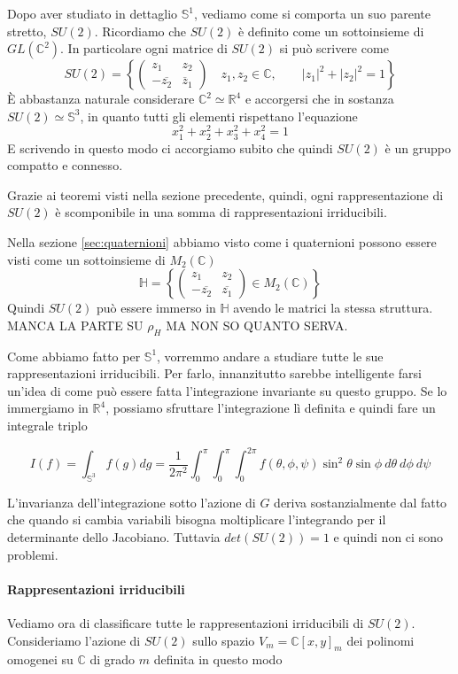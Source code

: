 \documentclass[11pt]{article}
\theoremstyle{plain}
\theoremstyle{definition}
\theoremstyle{remark}
\newcommand{\C}{\mathbb{C}}
\newcommand{\R}{\mathbb{R}}
\newcommand{\HH}{\mathbb{H}}
\newcommand{\dint}{\displaystyle\int}
\DeclareMathOperator{\iso}{\simeq}
\begin{document}
Dopo aver studiato in dettaglio $\mathbb{S}^1$, vediamo come si comporta un suo parente stretto, $SU(2)$. Ricordiamo che $SU(2)$ è definito come un sottoinsieme di $GL(\C^2)$. In particolare ogni matrice di $SU(2)$ si può scrivere come
 \[ SU(2) = \left\{  \left(\begin{array}{cc} z_1 & z_2 \\ -\overline{z_2} & \overline z_1 \end{array}\right) \quad z_1, z_2 \in \C  , \qquad |z_1|^2 + |z_2|^2 = 1\right\} \]
 È abbastanza naturale considerare $\C^2 \iso \R^4$ e accorgersi che in sostanza $SU(2) \iso \mathbb{S}^3$, in quanto tutti gli elementi rispettano l'equazione
 \[ x_1 ^2 + x_2^2 + x_3^2 + x_4^2 = 1 \]
E scrivendo in questo modo ci accorgiamo subito che quindi $SU(2)$ è un gruppo compatto e connesso.

Grazie ai teoremi visti nella sezione precedente, quindi,
ogni rappresentazione di $SU(2)$ è scomponibile in una somma di rappresentazioni irriducibili.

Nella sezione \ref{sec:quaternioni} abbiamo visto come i quaternioni possono essere visti come un sottoinsieme di $M_2(\C)$
\[
\mathbb{H}= \left\{\begin{pmatrix}
 z_1& z_2\\
 -\overline{z_2}& \overline{z_1}
\end{pmatrix}\in M_2(\C) \right\}
\]
Quindi $SU(2)$ può essere immerso in $\HH$ avendo le matrici la stessa struttura.\\
 MANCA LA PARTE SU $\rho_H$ MA NON SO QUANTO SERVA.



Come abbiamo fatto per $\mathbb{S}^1$, vorremmo andare a studiare tutte le sue rappresentazioni irriducibili. Per farlo, innanzitutto sarebbe intelligente farsi un'idea di come può essere fatta l'integrazione invariante su questo gruppo. Se lo immergiamo in $\R^4$, possiamo sfruttare l'integrazione lì definita e quindi fare un integrale triplo

 \[ I(f) = \dint_{\mathbb{S}^3} f(g) dg = \dfrac{1}{2\pi^2} \dint_0^\pi \dint_0^{\pi} \dint_0 ^{2\pi} f(\theta, \phi, \psi) \sin^2\theta\sin\phi \ d\theta \ d\phi \ d\psi\]


L'invarianza dell'integrazione sotto l'azione di $G$ deriva sostanzialmente dal fatto che quando si cambia variabili bisogna moltiplicare l'integrando per il determinante dello Jacobiano. Tuttavia $det(SU(2)) = 1$ e quindi non ci sono problemi.

\paragraph{Rappresentazioni irriducibili}
Vediamo ora di classificare tutte le rappresentazioni irriducibili di $SU(2)$.
Consideriamo l'azione di $SU(2)$ sullo spazio $V_m = \C[x,y]_m$ dei polinomi omogenei su $\C$ di grado $m$ definita in questo modo
\end{document}
